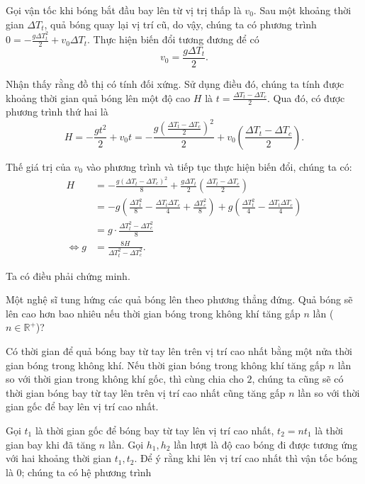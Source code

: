 \documentclass[a4paper, titlepage, openany]{book}
\newcounter{exercise}
\newcounter{solution}
\numberwithin{equation}{chapter}
\begin{document}
\solution

Gọi vận tốc khi bóng bắt đầu bay lên từ vị trị thấp là $v_0$. Sau một khoảng thời gian $\Delta T_t$, quả bóng quay lại vị trí cũ, do vậy, chúng ta có phương trình $0 = -\frac{g \Delta T_t^2}{2} + v_0 \Delta T_t$. Thực hiện biến đổi tương đương để có $$v_0=\frac{g \Delta T_t}{2}.$$

Nhận thấy rằng đồ thị có tính đối xứng. Sử dụng điều đó, chúng ta tính được khoảng thời gian quả bóng lên một độ cao $H$ là $t=\frac{\Delta T_t-\Delta T_c}{2}$. Qua đó, có được phương trình thứ hai là $$H = -\frac{g t^2}{2} + v_0 t=-\frac{g \left(\frac{\Delta T_t-\Delta T_c}{2}\right)^2}{2} + v_0 \left(\frac{\Delta T_t-\Delta T_c}{2}\right).$$

Thế giá trị của $v_0$ vào phương trình và tiếp tục thực hiện biến đổi, chúng ta có:
\begin{align*}
   H &= -\frac{g \left(\Delta T_t-\Delta T_c\right)^2}{8} + \frac{g \Delta T_t}{2} \left(\frac{\Delta T_t-\Delta T_c}{2}\right) \\
   &= -g\left(\frac{\Delta T_t^2}{8} - \frac{\Delta T_t\Delta T_c}{4} + \frac{\Delta T_c^2}{8}\right) + g\left(\frac{\Delta T_t^2}{4} - \frac{\Delta T_t\Delta T_c}{4}\right) \\
   &= g\cdot \frac{\Delta T_t^2 - \Delta T_c^2}{8} \\
   \iff g &= \frac{8H}{\Delta T_t^2 - \Delta T_c^2}.
\end{align*}

Ta có điều phải chứng minh.

\exercise Một nghệ sĩ tung hứng các quả bóng lên theo phương thẳng đứng. Quả bóng sẽ lên cao hơn bao nhiêu nếu thời gian bóng trong không khí tăng gấp $n$ lần ($n \in \mathbb{R}^+$)?

\solution

Có thời gian để quả bóng bay từ tay lên trên vị trí cao nhất bằng một nửa thời gian bóng trong không khí. Nếu thời gian bóng trong không khí tăng gấp $n$ lần so với thời gian trong không khí gốc, thì cùng chia cho $2$, chúng ta cũng sẽ có thời gian bóng bay từ tay lên trên vị trí cao nhất cũng tăng gấp $n$ lần so với thời gian gốc để bay lên vị trí cao nhất.

Gọi $t_1$ là thời gian gốc để bóng bay từ tay lên vị trí cao nhất, $t_2 = n t_1$ là thời gian bay khi đã tăng $n$ lần. Gọi $h_1, h_2$ lần lượt là độ cao bóng đi được tương ứng với hai khoảng thời gian $t_1, t_2$. Để ý rằng khi lên vị trí cao nhất thì vận tốc bóng là $0$; chúng ta có hệ phương trình
\end{document}
